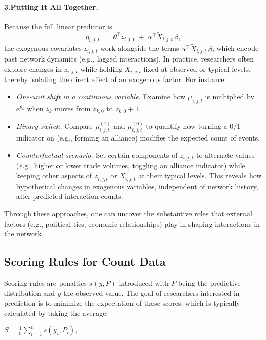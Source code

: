 \paragraph{3.\;\;Putting It All Together.}
Because the full linear predictor is 
\[
\eta_{i,j,t} \;=\;\theta^\top z_{i,j,t} \;+\;\alpha^\top \tilde{X}_{i,j,t}\,\beta,
\]
the exogenous covariates \(z_{i,j,t}\) work alongside the terms \(\alpha^\top \tilde{X}_{i,j,t}\,\beta\), which encode past network dynamics (e.g., lagged interactions). In practice, researchers often explore changes in \(z_{i,j,t}\) while holding \(\tilde{X}_{i,j,t}\) fixed at observed or typical levels, thereby isolating the direct effect of an exogenous factor. For instance:
\begin{itemize}
	\item \emph{One-unit shift in a continuous variable.} Examine how \(\mu_{i,j,t}\) is multiplied by \(e^{\theta_k}\) when \(z_{k}\) moves from \(z_{k,0}\) to \(z_{k,0}+1\).
	\item \emph{Binary switch.} Compare \(\mu_{i,j,t}^{(1)}\) and \(\mu_{i,j,t}^{(0)}\) to quantify how turning a 0/1 indicator on (e.g., forming an alliance) modifies the expected count of events.
	\item \emph{Counterfactual scenario.} Set certain components of \(z_{i,j,t}\) to alternate values (e.g., higher or lower trade volumes, toggling an alliance indicator) while keeping other aspects of \(z_{i,j,t}\) or \(\tilde{X}_{i,j,t}\) at their typical levels. This reveals how hypothetical changes in exogenous variables, independent of network history, alter predicted interaction counts.
\end{itemize}

Through these approaches, one can uncover the substantive roles that external factors (e.g., political ties, economic relationships) play in shaping interactions in the network. 

\clearpage
\newpage
\subsection*{Scoring Rules for Count Data}

Scoring rules are penalties $s(y,P)$ introduced with $P$ being the predictive distribution and $y$ the observed value. The goal of researchers interested in prediction is to minimize the expectation of these scores, which is typically calculated by taking the average:

$S = \frac{1}{n} \sum_{i=1}^{n} s(y_{i}, P_{i}),$

